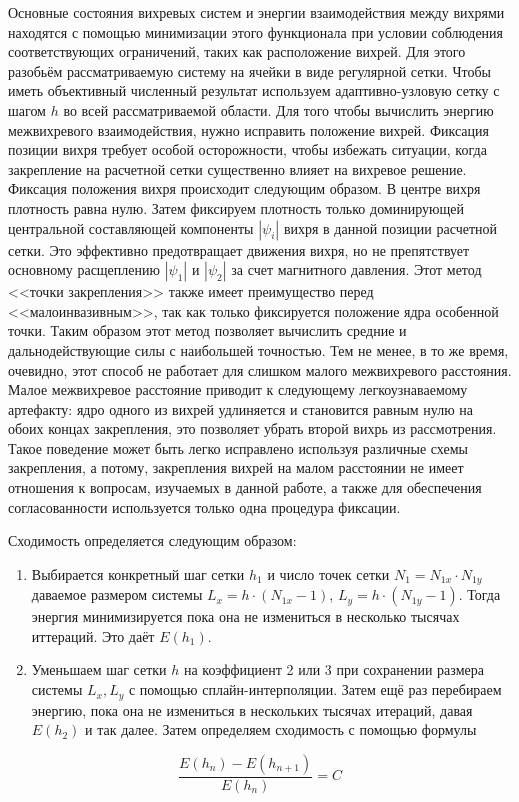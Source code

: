 Основные состояния вихревых систем и энергии взаимодействия между вихрями 
находятся с помощью минимизации этого функционала при условии соблюдения 
соответствующих ограничений, таких как расположение вихрей. Для этого разобьём 
рассматриваемую систему на ячейки в виде регулярной сетки. Чтобы иметь 
объективный численный результат используем адаптивно-узловую сетку с шагом 
\( h \) во всей рассматриваемой области. Для того чтобы вычислить энергию 
межвихревого взаимодействия, нужно исправить положение вихрей. Фиксация 
позиции вихря требует особой осторожности, чтобы избежать ситуации, когда 
закрепление на расчетной сетки существенно влияет на вихревое решение. 
Фиксация положения вихря происходит следующим образом. В центре вихря 
плотность равна нулю. Затем фиксируем плотность только доминирующей 
центральной составляющей компоненты \( |\psi_i| \) вихря в данной позиции 
расчетной сетки. Это эффективно предотвращает движения вихря, но не 
препятствует основному расщеплению \( |\psi_1| \) и \( |\psi_2| \) за счет 
магнитного давления. Этот метод <<точки закрепления>> также имеет преимущество 
перед <<малоинвазивным>>, так как только фиксируется положение ядра особенной 
точки. Таким образом этот метод позволяет вычислить средние и 
дальнодействующие силы с наибольшей точностью. Тем не менее, в то же время, 
очевидно, этот способ не работает для слишком малого межвихревого расстояния. 
Малое межвихревое расстояние приводит к следующему легкоузнаваемому артефакту: 
ядро одного из вихрей удлиняется и становится равным нулю на обоих концах 
закрепления, это позволяет убрать второй вихрь из рассмотрения. Такое 
поведение может быть легко исправлено используя различные схемы закрепления, а 
потому, закрепления вихрей на малом расстоянии не имеет отношения к вопросам, 
изучаемых в данной работе, а также для обеспечения согласованности 
используется только одна процедура фиксации.

Сходимость определяется следующим образом:
\begin{enumerate}
    \item Выбирается конкретный шаг сетки \( h_1 \) и число точек сетки 
        \( N_1 = N_{1x} \cdot N_{1y} \) даваемое размером системы
        \( L_x = h \cdot (N_{1x}-1) \), \( L_y = h \cdot (N_{1y}-1) \). 
        Тогда энергия минимизируется пока она не измениться в несколько
        тысячах иттераций. Это даёт \( E(h_1) \).
    \item Уменьшаем шаг сетки \( h \) на коэффициент 2 или 3 при сохранении 
        размера системы \( L_x, L_y \) с помощью сплайн-интерполяции. 
        Затем ещё раз перебираем энергию, пока она не измениться в 
        нескольких тысячах итераций, давая \( E(h_2) \) и так далее. 
        Затем определяем сходимость с помощью формулы
\end{enumerate}
\begin{equation}
    \frac{E(h_n) - E(h_{n+1})}{E(h_n)} = C
\end{equation}

